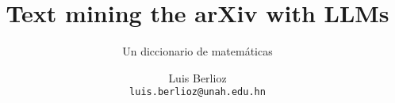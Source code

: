 \documentclass[10pt]{beamer}
\title{Text mining the arXiv with LLMs}
\subtitle{Un diccionario de matemáticas}
\author{Luis Berlioz\\
\texttt{luis.berlioz@unah.edu.hn}}
\institute{Universidad Nacional Autónoma de Honduras}
\begin{document}
\begin{frame}
\titlepage
\end{frame}
\end{document}
